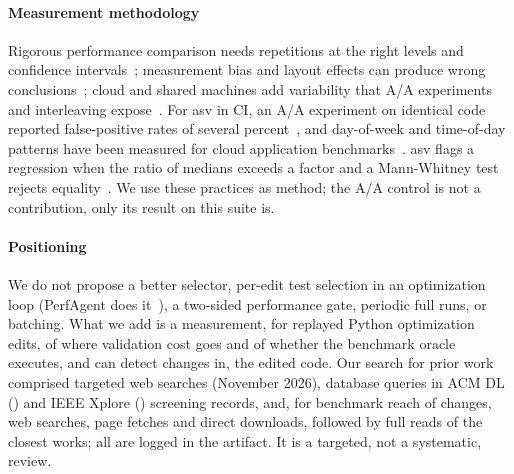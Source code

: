 \paragraph*{Measurement methodology}
Rigorous performance comparison needs repetitions at the right levels and confidence intervals~\cite{georges2007rigorous,kalibera2013rigorous,kalibera2020effectsize}; measurement bias and layout effects can produce wrong conclusions~\cite{mytkowicz2009wrong,curtsinger2013stabilizer}; cloud and shared machines add variability that A/A experiments and interleaving expose~\cite{laaber2019cloud,bulej2020duet}.
For asv in CI, an A/A experiment on identical code reported false-positive rates of several percent~\cite{rodriguezguerra2021quansight}, and day-of-week and time-of-day patterns have been measured for cloud application benchmarks~\cite{henning2025when}.
asv flags a regression when the ratio of medians exceeds a factor and a Mann-Whitney test rejects equality~\cite{asvcommands}.
We use these practices as method; the A/A control is not a contribution, only its result on this suite is.

\paragraph*{Positioning}
We do not propose a better selector, per-edit test selection in an optimization loop (PerfAgent does it~\cite{deng2026perfagent}), a two-sided performance gate, periodic full runs, or batching.
What we add is a measurement, for replayed Python optimization edits, of where validation cost goes and of whether the benchmark oracle executes, and can detect changes in, the edited code.
Our search for prior work comprised \SearchTargeted{} targeted web searches (November 2026), \SearchDBQueries{} database queries in ACM DL (\SearchACM) and IEEE Xplore (\SearchIEEE) screening \SearchScreened{} records, and, for benchmark reach of changes, \SearchReachWeb{} web searches, \SearchReachFetch{} page fetches and \SearchReachDownload{} direct downloads, followed by full reads of the closest works; all are logged in the artifact.
It is a targeted, not a systematic, review.
